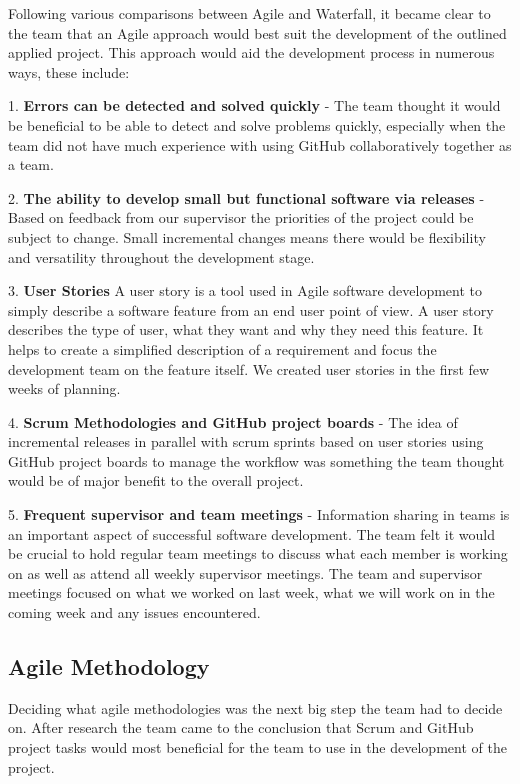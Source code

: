 Following various comparisons between Agile and Waterfall, it became clear to the team that an Agile approach would best suit the development of the outlined applied project. This approach would aid the development process in numerous ways, these include:

\vspace{5mm}
1. \textbf{Errors can be detected and solved quickly} - The team thought it would be beneficial to be able to detect and solve problems quickly, especially when the team did not have much experience with using GitHub collaboratively together as a team.

2. \textbf{The ability to develop small but functional software via releases} - Based on feedback from our supervisor the priorities of the project could be subject to change. Small incremental changes means there would be flexibility and versatility throughout the development stage.

3. \textbf{User Stories}
A user story is a tool used in Agile software development to simply describe a software feature from an end user point of view. A user story describes the type of user, what they want and why they need this feature. It helps to create a simplified description of a requirement and focus the development team on the feature itself. We created user stories in the first few weeks of planning.

4. \textbf{Scrum Methodologies and GitHub project boards } - The idea of incremental releases in parallel with scrum sprints based on user stories using GitHub project boards to manage the workflow was something the team thought would be of major benefit to the overall project.

5. \textbf{Frequent supervisor and team meetings} - Information sharing in teams is an important aspect of successful software development. The team felt it would be crucial to hold regular team meetings to discuss what each member is working on as well as attend all weekly supervisor meetings. The team and supervisor meetings focused on what we worked on last week, what we will work on in the coming week and any issues encountered.

\subsection{Agile Methodology}
Deciding what agile methodologies was the next big step the team had to decide on. After research the team came to the conclusion that Scrum and GitHub project tasks would most beneficial for the team to use in the development of the project.


